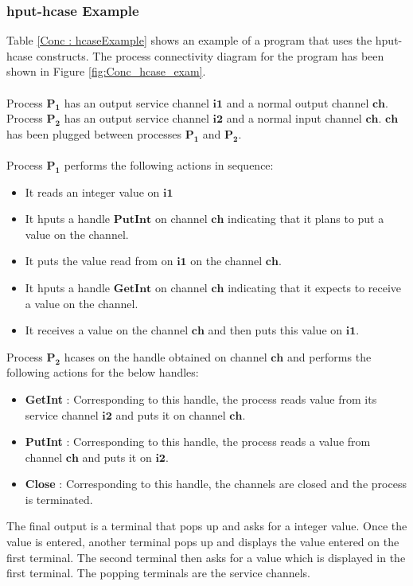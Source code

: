\documentclass[11pt]{article}
\newcommand{\<}{\langle}
\renewcommand{\>}{\rangle}
\begin{document}
\subsubsection {hput-hcase Example}
Table \ref {Conc : hcaseExample} shows an example of a program that uses the {\sf hput-hcase} constructs. The process connectivity diagram for the program has been shown in Figure \ref {fig:Conc_hcase_exam}.
~~\\~~\\ 
Process $\mathbf{P_1}$ has an output service channel $\mathbf{i1}$ and a normal output channel $\mathbf{ch}$. Process $\mathbf{P_2}$ has an output service channel $\mathbf{i2}$ and a normal input channel $\mathbf{ch}$. $\mathbf{ch}$ has been plugged between processes $\mathbf{P_1}$ and $\mathbf{P_2}$.
~~\\~~\\ 
Process $\mathbf{P_1}$ performs the following actions in sequence:
\begin{itemize}
  \item It reads an integer value on $\mathbf{i1}$
  \item It hputs a handle $\mathbf {PutInt}$ on channel $\mathbf{ch}$ indicating that it plans to put a value on the channel. 
  \item It puts the value read from on $\mathbf{i1}$ on the channel $\mathbf{ch}$. 
  \item It hputs a handle $\mathbf {GetInt}$ on channel $\mathbf{ch}$ indicating that it expects to receive a value on the channel. 
  \item It receives a value on the channel $\mathbf{ch}$ and then puts this value on $\mathbf{i1}$. 
\end{itemize}
Process $\mathbf{P_2}$ hcases on the handle obtained on channel $\mathbf{ch}$ and performs the following actions for the below handles:
\begin{itemize}
  \item {\bf GetInt} : Corresponding to this handle, the process reads value from its service channel $\mathbf{i2}$ and puts it on channel $\mathbf{ch}$.
  \item {\bf PutInt} : Corresponding to this handle, the process reads a value from channel $\mathbf{ch}$ and puts it on $\mathbf{i2}$.
  \item {\bf Close}  : Corresponding to this handle, the channels are closed and the process is terminated.
\end{itemize}
The final output is a terminal that pops up and asks for a integer value. Once the value is entered, another terminal pops up and displays the value entered on the first terminal. The second terminal then asks for a value which is displayed in the first terminal. The popping terminals are the service channels.
\end{document}
